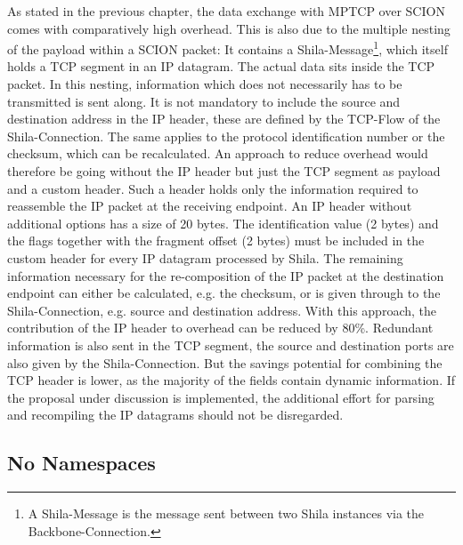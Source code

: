 As stated in the previous chapter, the data exchange with MPTCP over SCION comes with comparatively high overhead. This is also due to the multiple nesting of the payload within a SCION packet: It contains a Shila-Message\footnote{A Shila-Message is the message sent between two Shila instances via the Backbone-Connection.}, which itself holds a TCP segment in an IP datagram. The actual data sits inside the TCP packet. In this nesting, information which does not necessarily has to be transmitted is sent along. It is not mandatory to include the source and destination address in the IP header, these are defined by the TCP-Flow of the Shila-Connection. The same applies to the protocol identification number or the checksum, which can be recalculated. An approach to reduce overhead would therefore be going without the IP header but just the TCP segment as payload and a custom header. Such a header holds only the information required to reassemble the IP packet at the receiving endpoint. An IP header without additional options has a size of 20 bytes. The identification value (2 bytes) and the flags together with the fragment offset (2 bytes) must be included in the custom header for every IP datagram processed by Shila. The remaining information necessary for the re-composition of the IP packet at the destination endpoint can either be calculated, e.g. the checksum, or is given through to the Shila-Connection, e.g. source and destination address. With this approach, the contribution of the IP header to overhead can be reduced by 80\%. Redundant information is also sent in the TCP segment, the source and destination ports are also given by the Shila-Connection. But the savings potential for combining the TCP header is lower, as the majority of the fields contain dynamic information. If the proposal under discussion is implemented, the additional effort for parsing and recompiling the IP datagrams should not be disregarded.
	
\subsection*{No Namespaces}

